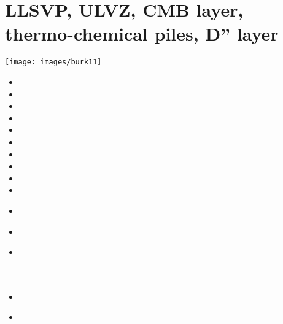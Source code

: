 \section{LLSVP, ULVZ, CMB layer, thermo-chemical piles, D'' layer}

\begin{center}
\texttt{[image: images/burk11]}\cite{burk11}
\end{center}

\begin{small}
\begin{itemize}
\item[\nineteeneighty]       
\item[\nineteeneightysix]    
\item[\nineteeneightyeight]  
\item[\nineteeneightynine]   
\item[\nineteenninetyfour]   
\item[\nineteenninetysix]    
\item[\nineteenninetyseven]  
\item[\nineteenninetyeight]  
\item[\twothousand]
\item[\twothousandone]       
\item[\twothousandtwo]       
 \\
\item[\twothousandfour]      
 \\
\item[\twothousandfive]      
 \\
 \\
 \\
\item[\twothousandsix]       
\item[\twothousandseven]     
\\
 \\

\end{itemize}
\end{small}
